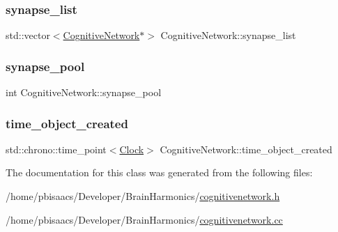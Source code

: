 \subsubsection{\texorpdfstring{synapse\+\_\+list}{synapse\_list}}
{\footnotesize\ttfamily std\+::vector$<$\mbox{\hyperlink{classCognitiveNetwork}{Cognitive\+Network}}$\ast$$>$ Cognitive\+Network\+::synapse\+\_\+list\hspace{0.3cm}{\ttfamily [protected]}}

\mbox{\label{classCognitiveNetwork_acce7f5451dd50c27689d2239fbd66394}} 
\subsubsection{\texorpdfstring{synapse\+\_\+pool}{synapse\_pool}}
{\footnotesize\ttfamily int Cognitive\+Network\+::synapse\+\_\+pool\hspace{0.3cm}{\ttfamily [private]}}

\mbox{\label{classCognitiveNetwork_a00751b9bc40bf22efd7a86a58478c760}} 
\subsubsection{\texorpdfstring{time\+\_\+object\+\_\+created}{time\_object\_created}}
{\footnotesize\ttfamily std\+::chrono\+::time\+\_\+point$<$\mbox{\hyperlink{universe_8h_a0ef8d951d1ca5ab3cfaf7ab4c7a6fd80}{Clock}}$>$ Cognitive\+Network\+::time\+\_\+object\+\_\+created\hspace{0.3cm}{\ttfamily [private]}}



The documentation for this class was generated from the following files\+:\begin{DoxyCompactItemize}
\item 
/home/pbisaacs/\+Developer/\+Brain\+Harmonics/\mbox{\hyperlink{cognitivenetwork_8h}{cognitivenetwork.\+h}}\item 
/home/pbisaacs/\+Developer/\+Brain\+Harmonics/\mbox{\hyperlink{cognitivenetwork_8cc}{cognitivenetwork.\+cc}}\end{DoxyCompactItemize}
